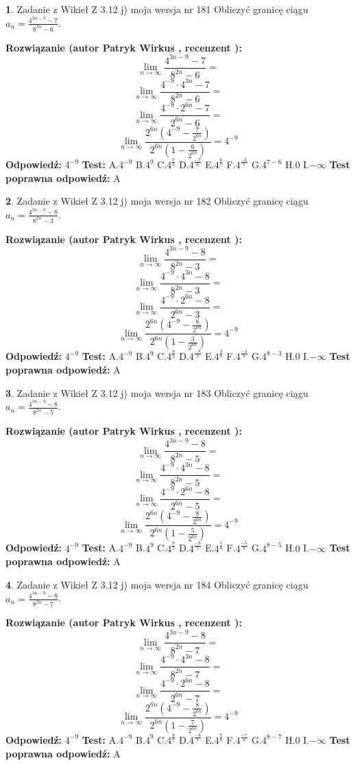 \documentclass[12pt, a4paper]{article}
\theoremstyle{definition} %
\newtheorem{zad}{}
\newcommand{\zadStart}[1]{\begin{zad}#1\newline}
\newcommand{\zadStop}{\end{zad}}
\newcommand{\rozwStart}[2]{\noindent \textbf{Rozwiązanie (autor #1 , recenzent #2): }\newline}
\newcommand{\rozwStop}{\newline}
\newcommand{\odpStart}{\noindent \textbf{Odpowiedź:}\newline}
\newcommand{\odpStop}{\newline}
\newcommand{\testStart}{\noindent \textbf{Test:}\newline}
\newcommand{\testStop}{\newline}
\newcommand{\kluczStart}{\noindent \textbf{Test poprawna odpowiedź:}\newline}
\newcommand{\kluczStop}{\newline}
\begin{document}
\zadStart{Zadanie z Wikieł Z 3.12 j) moja wersja nr 181}
Obliczyć granicę ciągu $a_{n}=\frac{4^{3n-9}-7}{8^{2n}-6}$.
\zadStop
\rozwStart{Patryk Wirkus}{}
$$\lim\limits_{n\to\infty}\frac{4^{3n-9}-7}{8^{2n}-6}=$$
$$\lim\limits_{n\to\infty}\frac{4^{-9} \cdot 4^{3n}-7}{8^{2n}-6}=$$
$$\lim\limits_{n\to\infty}\frac{4^{-9} \cdot 2^{6n}-7}{2^{6n}-6}=$$
$$\lim\limits_{n\to\infty}\frac{2^{6n}(4^{-9} - \frac{7}{2^{6n}})}{2^{6n}(1-\frac{6}{2^{6n}})}= 4^{-9}$$
\rozwStop
\odpStart
$4^{-9}$
\odpStop
\testStart
A.$4^{-9}$
B.$4^{9}$
C.$4^{\frac{7}{6}}$
D.$4^{\frac{-7}{6}}$
E.$4^{\frac{6}{7}}$
F.$4^{\frac{-6}{7}}$
G.$4^{7-6}$
H.$0$
I.$-\infty$
\testStop
\kluczStart
A
\kluczStop



\zadStart{Zadanie z Wikieł Z 3.12 j) moja wersja nr 182}
Obliczyć granicę ciągu $a_{n}=\frac{4^{3n-9}-8}{8^{2n}-3}$.
\zadStop
\rozwStart{Patryk Wirkus}{}
$$\lim\limits_{n\to\infty}\frac{4^{3n-9}-8}{8^{2n}-3}=$$
$$\lim\limits_{n\to\infty}\frac{4^{-9} \cdot 4^{3n}-8}{8^{2n}-3}=$$
$$\lim\limits_{n\to\infty}\frac{4^{-9} \cdot 2^{6n}-8}{2^{6n}-3}=$$
$$\lim\limits_{n\to\infty}\frac{2^{6n}(4^{-9} - \frac{8}{2^{6n}})}{2^{6n}(1-\frac{3}{2^{6n}})}= 4^{-9}$$
\rozwStop
\odpStart
$4^{-9}$
\odpStop
\testStart
A.$4^{-9}$
B.$4^{9}$
C.$4^{\frac{8}{3}}$
D.$4^{\frac{-8}{3}}$
E.$4^{\frac{3}{8}}$
F.$4^{\frac{-3}{8}}$
G.$4^{8-3}$
H.$0$
I.$-\infty$
\testStop
\kluczStart
A
\kluczStop



\zadStart{Zadanie z Wikieł Z 3.12 j) moja wersja nr 183}
Obliczyć granicę ciągu $a_{n}=\frac{4^{3n-9}-8}{8^{2n}-5}$.
\zadStop
\rozwStart{Patryk Wirkus}{}
$$\lim\limits_{n\to\infty}\frac{4^{3n-9}-8}{8^{2n}-5}=$$
$$\lim\limits_{n\to\infty}\frac{4^{-9} \cdot 4^{3n}-8}{8^{2n}-5}=$$
$$\lim\limits_{n\to\infty}\frac{4^{-9} \cdot 2^{6n}-8}{2^{6n}-5}=$$
$$\lim\limits_{n\to\infty}\frac{2^{6n}(4^{-9} - \frac{8}{2^{6n}})}{2^{6n}(1-\frac{5}{2^{6n}})}= 4^{-9}$$
\rozwStop
\odpStart
$4^{-9}$
\odpStop
\testStart
A.$4^{-9}$
B.$4^{9}$
C.$4^{\frac{8}{5}}$
D.$4^{\frac{-8}{5}}$
E.$4^{\frac{5}{8}}$
F.$4^{\frac{-5}{8}}$
G.$4^{8-5}$
H.$0$
I.$-\infty$
\testStop
\kluczStart
A
\kluczStop



\zadStart{Zadanie z Wikieł Z 3.12 j) moja wersja nr 184}
Obliczyć granicę ciągu $a_{n}=\frac{4^{3n-9}-8}{8^{2n}-7}$.
\zadStop
\rozwStart{Patryk Wirkus}{}
$$\lim\limits_{n\to\infty}\frac{4^{3n-9}-8}{8^{2n}-7}=$$
$$\lim\limits_{n\to\infty}\frac{4^{-9} \cdot 4^{3n}-8}{8^{2n}-7}=$$
$$\lim\limits_{n\to\infty}\frac{4^{-9} \cdot 2^{6n}-8}{2^{6n}-7}=$$
$$\lim\limits_{n\to\infty}\frac{2^{6n}(4^{-9} - \frac{8}{2^{6n}})}{2^{6n}(1-\frac{7}{2^{6n}})}= 4^{-9}$$
\rozwStop
\odpStart
$4^{-9}$
\odpStop
\testStart
A.$4^{-9}$
B.$4^{9}$
C.$4^{\frac{8}{7}}$
D.$4^{\frac{-8}{7}}$
E.$4^{\frac{7}{8}}$
F.$4^{\frac{-7}{8}}$
G.$4^{8-7}$
H.$0$
I.$-\infty$
\testStop
\kluczStart
A
\kluczStop
\end{document}
